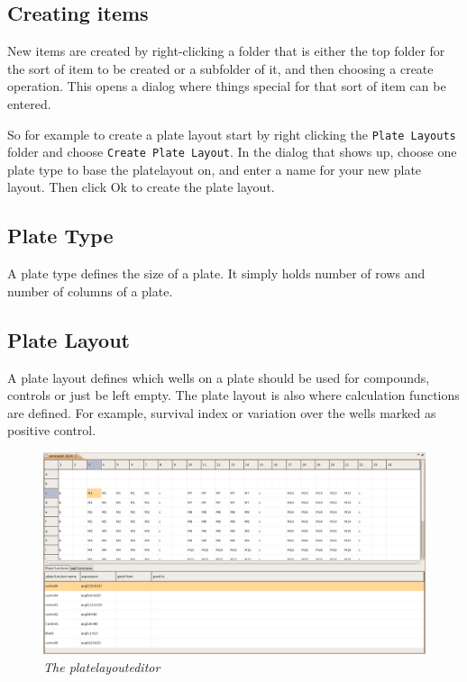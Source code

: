 \documentclass[a4paper,10pt]{article}
\begin{document}
        \subsection{Creating items}
            New items are created by right-clicking a folder that is either the
            top folder for the sort of item to be created or a subfolder of
            it, and then choosing a create operation. This opens a dialog
            where things special for that sort of item can be entered. 

            So for example to create a plate layout start by right clicking the
            \texttt{Plate Layouts} folder and choose \texttt{Create Plate
            Layout}. In the dialog that shows up, choose one plate type to base
            the platelayout on, and enter a name for your new plate layout.
            Then click Ok to create the plate layout.

        \subsection{Plate Type} A plate type defines the size of a plate. It
            simply holds number of rows and number of columns of a plate. 

        \subsection{Plate Layout}
            A plate layout defines which wells on a plate should be used for
            compounds, controls or just be left empty. The plate layout is also
            where calculation functions are defined. For example, survival
            index or variation over the wells marked as positive control. 

            \begin{figure}[htbp]
                \begin{center}
                    \includegraphics[width=1\textwidth]
                                    {images/plateLayoutEditor.png}
                \end{center}
                \caption{\textit{The platelayouteditor}}
                \label{platelayoutEditor}
            \end{figure}
\end{document}
